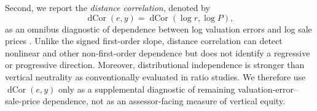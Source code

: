 \documentclass[10pt]{article}
\theoremstyle{definition}
\newcommand{\1}{\mathbf{1}}
\begin{document}
{Second, we report the \emph{distance correlation}}, denoted by
\begin{equation}
\label{eq:dcor_diagnostic}
\operatorname{dCor}(e,y)
=
\operatorname{dCor}(\log r,\log P),
\end{equation}
{as an omnibus diagnostic of dependence between log valuation errors and log sale prices \cite{SzekelyRizzoBakirov2007}. Unlike the signed first-order slope, distance correlation can detect nonlinear and other non-first-order dependence but does not identify a regressive or progressive direction. Moreover, distributional independence is stronger than vertical neutrality as conventionally evaluated in ratio studies. We therefore use $\operatorname{dCor}(e,y)$ only as a supplemental diagnostic of remaining valuation-error--sale-price dependence, not as an assessor-facing measure of vertical equity.}
\end{document}
